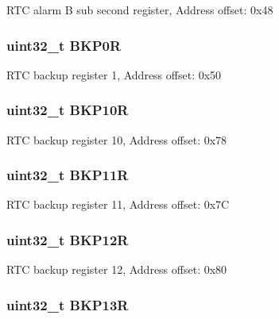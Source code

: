 R\-T\-C alarm B sub second register, Address offset\-: 0x48 \hypertarget{struct_r_t_c___type_def_a4808ec597e5a5fefd8a83a9127dd1aec}{
\subsubsection[{B\-K\-P0\-R}]{ uint32\-\_\-t B\-K\-P0\-R}}\label{struct_r_t_c___type_def_a4808ec597e5a5fefd8a83a9127dd1aec}
R\-T\-C backup register 1, Address offset\-: 0x50 \hypertarget{struct_r_t_c___type_def_aade2881a3e408bfd106b27f78bbbcfc9}{
\subsubsection[{B\-K\-P10\-R}]{ uint32\-\_\-t B\-K\-P10\-R}}\label{struct_r_t_c___type_def_aade2881a3e408bfd106b27f78bbbcfc9}
R\-T\-C backup register 10, Address offset\-: 0x78 \hypertarget{struct_r_t_c___type_def_ac66d5e2d3459cff89794c47dbc8f7228}{
\subsubsection[{B\-K\-P11\-R}]{ uint32\-\_\-t B\-K\-P11\-R}}\label{struct_r_t_c___type_def_ac66d5e2d3459cff89794c47dbc8f7228}
R\-T\-C backup register 11, Address offset\-: 0x7\-C \hypertarget{struct_r_t_c___type_def_a6f7eee5ae8a32c07f9c8fe14281bdaf3}{
\subsubsection[{B\-K\-P12\-R}]{ uint32\-\_\-t B\-K\-P12\-R}}\label{struct_r_t_c___type_def_a6f7eee5ae8a32c07f9c8fe14281bdaf3}
R\-T\-C backup register 12, Address offset\-: 0x80 \hypertarget{struct_r_t_c___type_def_a6ed4c3a0d4588a75078e9f8e376b4d06}{
\subsubsection[{B\-K\-P13\-R}]{ uint32\-\_\-t B\-K\-P13\-R}}\label{struct_r_t_c___type_def_a6ed4c3a0d4588a75078e9f8e376b4d06}
